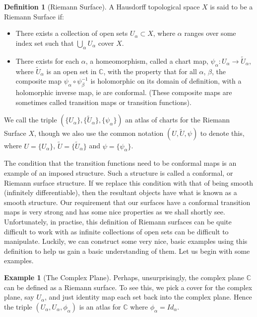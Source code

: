 \documentclass[11pt]{report}
\theoremstyle{definition}
\newtheorem{defn}[thm]{Definition}
\newtheorem{example}[thm]{Example}
\begin{document}
\begin{defn}[Riemann Surface]\label{rsdefn}
A Hausdorff topological space $X$ is said to be a Riemann Surface if:
\begin{itemize}
\item There exists a collection of open sets $U_{\alpha} \subset X$, where
  $
\alpha$ 
ranges over some index set such that $\bigcup\limits_{\alpha} U_{\alpha}$
cover 
$X$.
\item There exists for each $\alpha$, a homeomorphism, called a chart map,
  $ \psi_{\alpha}\colon U_{\alpha} \rightarrow \tilde{U}_{\alpha}$, where
$\tilde{U}_{\alpha}$ is 
  an open set in $\mathbb{C}$, with the property that for all $\alpha$,
  $\beta$, the composite map $\psi_{\alpha} \circ \psi_{\beta}^{-1}$ is
  holomorphic on its domain of definition, with a holomorphic inverse map, ie are conformal. (These composite maps are sometimes called transition maps or transition functions).
\end{itemize}
We call the triple $(\{U_\alpha\},\{\tilde{U}_{\alpha}\},
\{\psi_\alpha\})$ an 
atlas of 
charts for the Riemann Surface $X$, though we also use the common
notation $(U,
\tilde{U}, \psi)$ to denote this, where $U=\{U_\alpha\}$,
$\tilde{U}=\{\tilde{U}
_{\alpha}\}$ and $\psi=\{\psi_\alpha\}$.
\end{defn}
The condition that the transition functions need to be conformal maps is an example of an imposed structure. Such a structure is called a conformal, or Riemann surface structure. If we replace this condition with that of being smooth (infinitely differentiable), then the resultant objects have what is known as a smooth structure. Our requirement that our surfaces have a conformal transition maps is very strong and has some nice properties as we shall shortly see. Unfortunately, in practise, this definition of Riemann surfaces can be quite difficult to work with as infinite collections of open sets can be difficult to manipulate. Luckily, we can construct some very nice, basic examples using this definition to help us gain a basic understanding of them. Let us begin with some examples.
\begin{example}[The Complex Plane]
  Perhaps, unsurprisingly, the complex plane $\mathbb{C}$ can be defined as a Riemann surface. To see this, we pick a cover for the complex plane, say $U_{\alpha}$, and just identity map each set back into the complex plane. Hence the triple $(U_{\alpha},U_{\alpha},\phi_{\alpha})$ is an atlas for $\mathbb{C}$ where $\phi_{\alpha}=Id_{\alpha}$.
\end{example}
\end{document}
